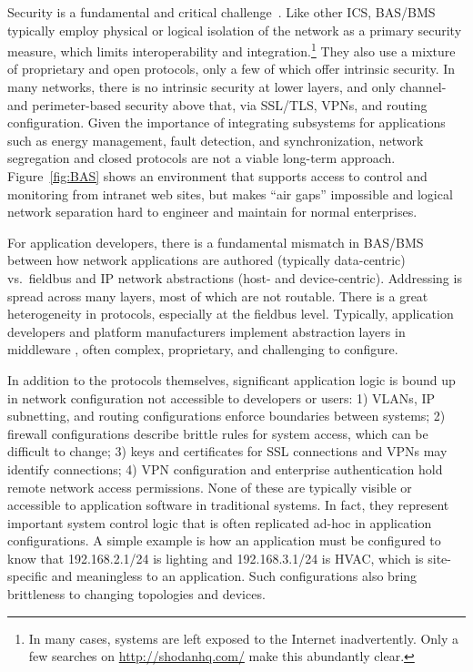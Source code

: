 Security is a fundamental and critical challenge~\cite{knapp2011industrial}. 
Like other ICS, BAS/BMS typically employ physical or logical isolation of the network as a primary security measure, which limits interoperability and integration.\footnote{In many cases, systems are left exposed to the Internet inadvertently. Only a few searches on \url{http://shodanhq.com/} make this abundantly clear.}   They also use a mixture of proprietary and open protocols, only a few of which offer intrinsic security. In many networks, there is no intrinsic security at lower layers, and only channel- and perimeter-based security above that, via SSL/TLS, VPNs, and routing configuration. Given the importance of integrating subsystems for applications such as energy management, fault detection, and synchronization,  network segregation and closed protocols are not a viable long-term approach. Figure~\ref{fig:BAS} shows an environment that supports access to control and monitoring from intranet web sites, but makes ``air gaps'' impossible and logical network separation hard to engineer and maintain for normal enterprises. 

For application developers, there is a fundamental mismatch in BAS/BMS between how network applications are authored (typically data-centric) vs.~fieldbus and IP network abstractions (host- and device-centric).  
Addressing is spread across many layers, most of which are not routable. There is a great heterogeneity in protocols, especially at the fieldbus level.  Typically, application developers and platform manufacturers implement abstraction layers in middleware \cite{Sauter2010}, often complex, proprietary, and challenging to configure.


In addition to the protocols themselves, significant application logic is bound up in network configuration not accessible to developers or users: 1) VLANs, IP subnetting, and routing configurations enforce boundaries between systems;
2) firewall configurations describe brittle rules for system access, which can be difficult to change; 3) keys and certificates for SSL connections and VPNs may identify connections; 4) VPN configuration and enterprise authentication hold remote network access permissions. None of these are typically visible or accessible to application software in traditional systems. In fact, they represent important system control logic that is often replicated ad-hoc in application configurations. A simple example is how an application must be configured to know that 192.168.2.1/24 is lighting and 192.168.3.1/24 is HVAC, which is site-specific and meaningless to an application.  Such configurations also bring brittleness to changing topologies and devices.

